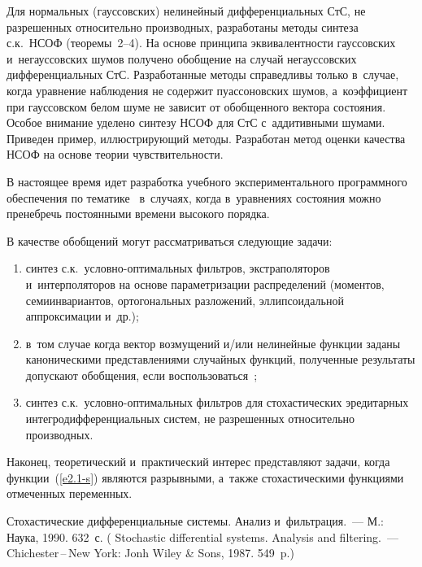\begin{multicols}{2}
Для нормальных (гауссовских) нелинейный дифференциальных СтС, не разрешенных 
относительно производных, разработаны методы синтеза  с.к.\
 НСОФ (теоремы~2--4). На основе принципа эквивалентности гауссовских и~негауссовских 
 шумов получено обобщение на случай негауссовских дифференциальных СтС.  
 Разработанные методы справедливы только в~случае, когда уравнение наблюдения 
 не содержит пуассоновских шумов, а~коэффициент при гауссовском белом шуме не зависит 
 от обобщенного вектора состояния. Особое внимание уделено синтезу НСОФ 
 для СтС с~аддитивными шумами. Приведен пример, иллюстрирующий методы. Разработан метод 
 оценки качества НСОФ на основе теории чувствительности.

В настоящее время идет разработка учебного экспериментального 
программного обеспечения по тематике~\cite{13-s, 14-s, 15-s, 16-s} в~случаях, когда в~уравнениях состояния
 можно пренебречь постоянными времени высокого порядка.

В качестве обобщений могут рассматриваться следующие задачи:
\begin{enumerate}[(1)]
\item синтез с.к.\ услов\-но-оп\-ти\-маль\-ных фильт\-ров, экстраполяторов и~интерполяторов 
на основе па\-ра\-мет\-ри\-за\-ции распределений (моментов, семиинвариантов, ортогональных разложений, 
эллипсоидальной аппроксимации и~др.);
\item в~том случае когда вектор возмущений и/или нелинейные функции заданы 
каноническими представлениями случайных функций, полученные результаты допускают 
обобщения, если воспользоваться~\cite{2-s, 3-s};
\item синтез  с.к.\ услов\-но-оп\-ти\-маль\-ных фильт\-ров для стохастических эредитарных 
интегродифференциальных сис\-тем, не разрешенных относительно производных.
\end{enumerate}

Наконец, теоретический и~практический интерес представляют задачи, 
когда функции~(\ref{e2.1-s}) являются разрывными, а~также стохастическими функциями отмеченных переменных.






{\small\frenchspacing
{%
\begin{thebibliography}{99}
Стохастические дифференциальные системы. Анализ и~фильтрация.~--- М.:
Наука,  1990.  632~с. (\Au{Pugachev~V.\,S., Sinitsyn I.\,N.}
Stochastic differential systems.
Analysis and filtering.~--- Chichester\,--\,New York: Jonh Wiley \& Sons, 1987.
549~p.)


\end{thebibliography}}}
\end{multicols}
